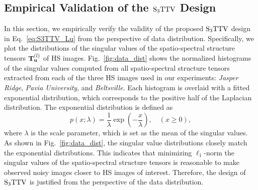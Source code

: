 \subsection{Empirical Validation of the ${\text{S}_{3} \text{TTV}}$ Design}
\label{subsec:DataDist}
In this section, we empirically verify the validity of the proposed ${\text{S}_{3} \text{TTV}}$ design in Eq.~\eqref{eq:S3TTV_Lu} from the perspective of data distribution. Specifically, we plot the distributions of the singular values of the spatio-spectral structure tensors $\mathbf{T}_{\mathbf{u}}^{(l)}$ of HS images. Fig.~\ref{fig:data_dist} shows the normalized histograms of the singular values computed from all spatio-spectral structure tensors extracted from each of the three HS images used in our experiments: \textit{Jasper Ridge}, \textit{Pavia University}, and \textit{Beltsville}. Each histogram is overlaid with a fitted exponential distribution, which corresponds to the positive half of the Laplacian distribution. The exponential distribution is defined as
\begin{equation}
	\label{eq:ExponentialDistribution}
	p(x; \lambda) = \frac{1}{\lambda} \exp\left(-\frac{x}{\lambda} \right), \quad (x \geq 0),
\end{equation}
where $\lambda$ is the scale parameter, which is set as the mean of the singular values. As shown in Fig.~\ref{fig:data_dist}, the singular value distributions closely match the exponential distributions. This indicates that minimizing $\ell_{1}$-norm the singular values of the spatio-spectral structure tensors is reasonable to make observed noisy images closer to HS images of interest. Therefore, the design of ${\text{S}_{3} \text{TTV}}$ is justified from the perspective of the data distribution.







